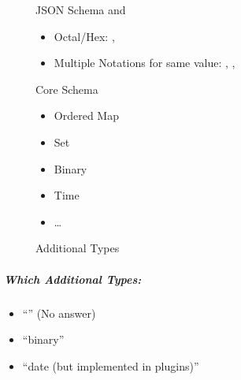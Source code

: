 \begin{figure}[H]
  \begin{minipage}[t]{0.48\textwidth}
    \vspace{0pt}
    \begin{bchart}[max=9, width=0.85\textwidth]
    \end{bchart}
  \end{minipage}
  \begin{minipage}[t]{0.48\textwidth}
    \vspace{0pt}
    JSON Schema and
      \vspace{-0.5cm}
      \begin{itemize}
        \item Octal/Hex: , 
        \item Multiple Notations for same value:
              , , \yaml{~}
      \end{itemize}
  \end{minipage}
  \caption{Core Schema}
\end{figure}

\begin{figure}[H]
  \begin{minipage}[t]{0.48\textwidth}
    \vspace{0pt}
    \begin{bchart}[max=9, width=0.85\textwidth]
    \end{bchart}
  \end{minipage}
  \begin{minipage}[t]{0.48\textwidth}
    \vspace{0pt}
    \begin{itemize}
      \item Ordered Map
      \item Set
      \item Binary
      \item Time
      \item …
    \end{itemize}
  \end{minipage}
  \caption{Additional Types}
\end{figure}

\subparagraph{Which Additional Types:}
\begin{itemize}
  \item “” (No answer)
  \item “binary”
  \item “date (but implemented in plugins)”
\end{itemize}

